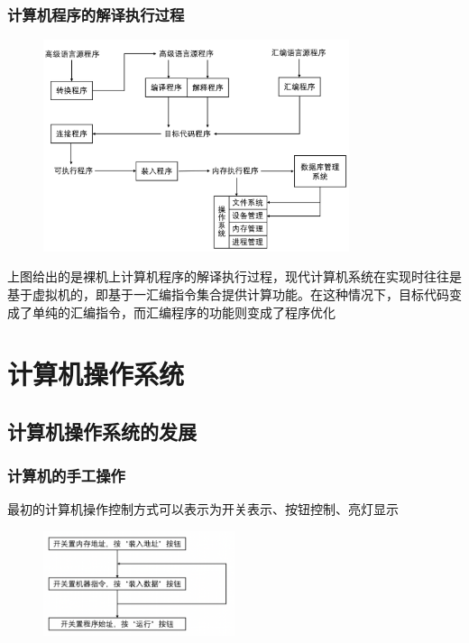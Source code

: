 \documentclass[cs4size,a4paper,10pt]{ctexart}
\begin{document}
	\subsubsection{计算机程序的解译执行过程}
	\begin{figure}[H]
		\centering
		\includegraphics[width=0.8\textwidth]{img/1.1.3.3}
	\end{figure}
	上图给出的是裸机上计算机程序的解译执行过程，现代计算机系统在实现时往往是基于虚拟机的，即基于一汇编指令集合提供计算功能。在这种情况下，目标代码变成了单纯的汇编指令，而汇编程序的功能则变成了程序优化



	\section{计算机操作系统}
	\subsection{计算机操作系统的发展}
	\subsubsection{计算机的手工操作}
	最初的计算机操作控制方式可以表示为开关表示、按钮控制、亮灯显示
	\begin{figure}[H]
		\centering
		\includegraphics[width=0.5\textwidth]{img/1.2.1.1}
	\end{figure}
\end{document}

